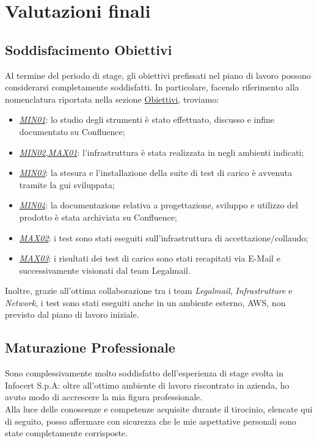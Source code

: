 
\chapter{Valutazioni finali}
\label{cap:analisi-requisiti}
\section{Soddisfacimento Obiettivi}
Al termine del periodo di stage, gli obiettivi prefissati nel piano di lavoro possono considerarsi completamente soddisfatti.
In particolare, facendo riferimento alla nomenclatura riportata nella sezione \hyperref[subsec:obiettivi]{Obiettivi}, troviamo:
\begin{itemize}
	\item \underline{\textit{MIN01}}: lo studio degli strumenti è stato effettuato, discusso e infine documentato su Confluence;
	\item \underline{\textit{MIN02,MAX01}}: l'infrastruttura è stata realizzata in negli ambienti indicati;
	\item \underline{\textit{MIN03}}: la stesura e l'installazione della suite di test di carico è avvenuta tramite la \gls{gui} sviluppata;
	\item \underline{\textit{MIN04}}: la documentazione relativa a progettazione, sviluppo e utilizzo del prodotto è stata archiviata su Confluence;
	\item \underline{\textit{MAX02}}: i test sono stati eseguiti sull'infrastruttura di accettazione/collaudo;
	\item \underline{\textit{MAX03}}: i risultati dei test di carico sono stati recapitati via E-Mail e successivamente visionati dal team Legalmail.
\end{itemize}
Inoltre, grazie all'ottima collaborazione tra i team \textit{Legalmail}, \textit{Infrastrutture} e \textit{Network}, i test sono stati eseguiti anche in un ambiente esterno, AWS, non previsto dal piano di lavoro iniziale.
\section{Maturazione Professionale}
Sono complessivamente molto soddisfatto dell'esperienza di stage svolta in Infocert S.p.A: oltre all'ottimo ambiente di lavoro riscontrato in azienda, ho avuto modo di accrescere la mia figura professionale. \\
Alla luce delle conoscenze e competenze acquisite durante il tirocinio, elencate qui di seguito, posso affermare con sicurezza che le mie aspettative personali sono state completamente corrisposte. 
